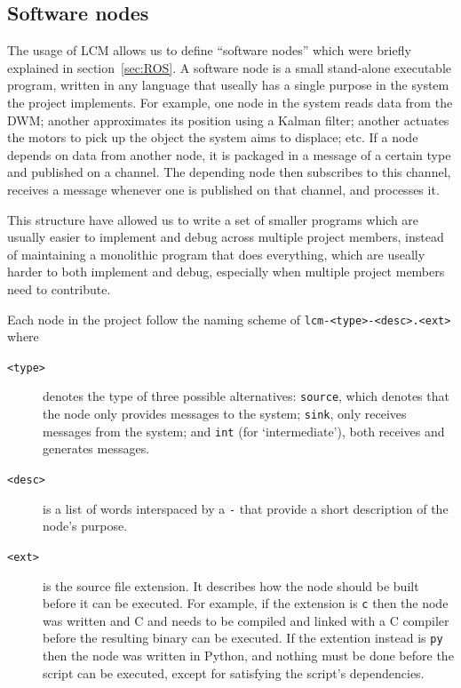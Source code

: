 \subsection{Software nodes}
The usage of LCM allows us to define ``software nodes'' which were briefly explained in section~\ref{sec:ROS}.
A software node is a small stand-alone executable program, written in any language that useally has a single purpose in the system the project implements.
For example, one node in the system reads data from the DWM;
another approximates its position using a Kalman filter;
another actuates the motors to pick up the object the system aims to displace; etc.
If a node depends on data from another node,
it is packaged in a message of a certain type and published on a channel.
The depending node then subscribes to this channel,
receives a message whenever one is published on that channel,
and processes it.

This structure have allowed us to write a set of smaller programs which are usually easier to implement and debug across multiple project members,
instead of maintaining a monolithic program that does everything, which are useally harder to both implement and debug,
especially when multiple project members need to contribute.


Each node in the project follow the naming scheme of \texttt{lcm-<type>-<desc>.<ext>} where
\begin{description}
\item[\texttt{<type>}] denotes the type of three possible alternatives:
  \texttt{source}, which denotes that the node only provides messages to the system;
  \texttt{sink}, only receives messages from the system; and
  \texttt{int} (for `intermediate'), both receives and generates messages.
\item[\texttt{<desc>}] is a list of words interspaced by a \texttt{-} that provide a short description of the node's purpose.
\item[\texttt{<ext>}] is the source file extension. It describes how the node should be built before it can be executed.
  For example, if the extension is \texttt{c} then the node was written and C and needs to be compiled and linked with a C compiler before the resulting binary can be executed.
  If the extention instead is \texttt{py} then the node was written in Python, and nothing must be done before the script can be executed,
  except for satisfying the script's dependencies.
\end{description}

